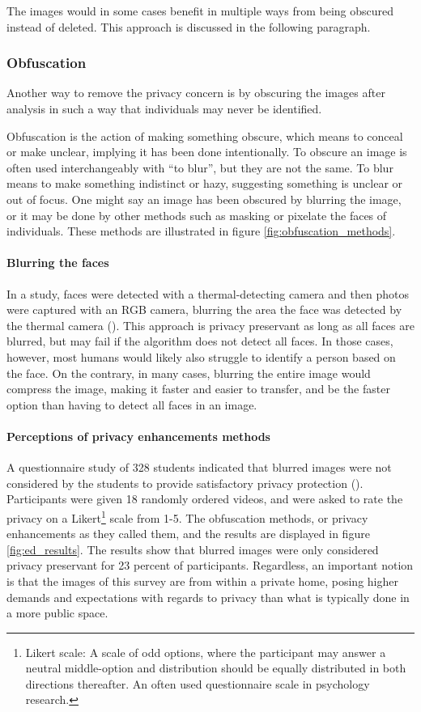 The images would in some cases benefit in multiple ways from being obscured instead of deleted. This approach is discussed in the following paragraph.

\subsubsection{Obfuscation}
\label{sec:obfuscation}
Another way to remove the privacy concern is by obscuring the images after analysis in such a way that individuals may never be identified.

Obfuscation is the action of making something obscure, which means to conceal or make unclear, implying it has been done intentionally. To obscure an image is often used interchangeably with “to blur”, but they are not the same. To blur means to make something indistinct or hazy, suggesting something is unclear or out of focus. One might say an image has been obscured by blurring the image, or it may be done by other methods such as masking or pixelate the faces of individuals. These methods are illustrated in figure \ref{fig:obfuscation_methods}.

\paragraph{Blurring the faces}
In a \citeyear{ma2019fall_anonymous} study, faces were detected with a thermal-detecting camera and then photos were captured with an RGB camera, blurring the area the face was detected by the thermal camera (\citeauthor{ma2019fall_anonymous}). This approach is privacy preservant as long as all faces are blurred, but may fail if the algorithm does not detect all faces. In those cases, however, most humans would likely also struggle to identify a person based on the face. On the contrary, in many cases, blurring the entire image would compress the image, making it faster and easier to transfer, and be the faster option than having to detect all faces in an image.

\paragraph{Perceptions of privacy enhancements methods}
A questionnaire study of 328 students indicated that blurred images were not considered by the students to provide satisfactory privacy protection (\cite{ed2012privacy_review}). Participants were given 18 randomly ordered videos, and were asked to rate the privacy on a Likert\footnote{Likert scale: A scale of odd options, where the participant may answer a neutral middle-option and distribution should be equally distributed in both directions thereafter. An often used questionnaire scale in psychology research.} scale from 1-5. The obfuscation methods, or privacy enhancements as they called them, and the results are displayed in figure \ref{fig:ed_results}. The results show that blurred images were only considered privacy preservant for 23 percent of participants. Regardless, an important notion is that the images of this survey are from within a private home, posing higher demands and expectations with regards to privacy than what is typically done in a more public space.

